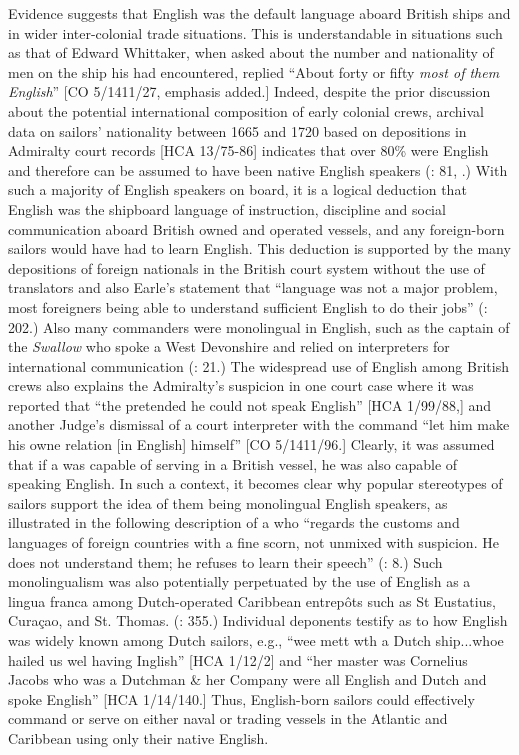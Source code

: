   Evidence suggests that English was the default language aboard British ships and in wider inter-colonial trade situations. This is understandable in situations such as that of Edward Whittaker, when asked about the number and nationality of men on the ship his  had encountered, replied “About forty or fifty \textit{most of them English}” [CO 5/1411/27, emphasis added.] Indeed, despite the prior discussion about the potential international composition of early colonial crews, archival data on sailors’ nationality between 1665 and 1720 based on depositions in Admiralty court records [HCA 13/75-86] indicates that over 80\% were English and therefore can be assumed to have been native English speakers (\citealt{Earle1993}: 81, .) With such a majority of English speakers on board, it is a logical deduction that English was the shipboard language of instruction, discipline and social communication aboard British owned and operated vessels, and any foreign-born sailors would have had to learn English. This deduction is supported by the many depositions of foreign nationals in the British court system without the use of translators and also Earle’s statement that “language was not a major problem, most foreigners being able to understand sufficient English to do their jobs” (\citeyear*{Earle1998}: 202.) Also many commanders were monolingual in English, such as the captain of the \textit{Swallow} who spoke a West Devonshire  and relied on interpreters for international communication (\citealt{Earle1998}: 21.) The widespread use of English among British crews also explains the Admiralty’s suspicion in one court case where it was reported that “the  pretended he could not speak English” [HCA 1/99/88,] and another Judge’s dismissal of a court interpreter with the command “let him make his owne relation [in English] himself” [CO 5/1411/96.] Clearly, it was assumed that if a  was capable of serving in a British vessel, he was also capable of speaking English.  In such a context, it becomes clear why popular stereotypes of sailors support the idea of them being monolingual English speakers, as illustrated in the following description of a  who “regards the customs and languages of foreign countries with a fine scorn, not unmixed with suspicion. He does not understand them; he refuses to learn their speech” (\citealt{FoxSmith1924}: 8.) Such monolingualism was also potentially perpetuated by the use of English as a lingua franca among Dutch-operated Caribbean entrepôts such as St Eustatius, Curaçao, and St. Thomas. (\citealt{Jarvis2010}: 355.) Individual deponents testify as to how English was widely known among Dutch sailors, e.g., “wee mett wth a Dutch ship...whoe hailed us wel having Inglish” [HCA 1/12/2] and “her master was Cornelius Jacobs who was a Dutchman \& her Company were all English and Dutch and spoke English” [HCA 1/14/140.] Thus, English-born sailors could effectively command or serve on either naval or trading vessels in the Atlantic and Caribbean using only their native English. 

